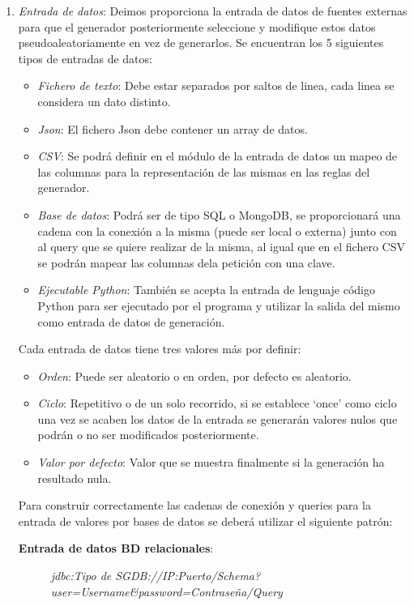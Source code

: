 \begin{enumerate}
	\item \emph{Entrada de datos}: Deimos proporciona la entrada de datos de fuentes externas para que el generador posteriormente seleccione y modifique estos datos pseudoaleatoriamente en vez de generarlos. Se encuentran los 5 siguientes tipos de entradas de datos:
	\begin{itemize}
		\item \emph{Fichero de texto}: Debe estar separados por saltos de linea, cada linea se considera un dato distinto.
		\item \emph{Json}: El fichero Json debe contener un array de datos.
		\item \emph{CSV}: Se podrá definir en el módulo de la entrada de datos un mapeo de las columnas para la representación de las mismas en las reglas del generador.
		\item \emph{Base de datos}: Podrá ser de tipo SQL o MongoDB, se proporcionará una cadena con la conexión a la misma (puede ser local o externa) junto con al query que se quiere realizar de la misma, al igual que en el fichero CSV se podrán mapear las columnas dela petición con una clave.
		\item \emph{Ejecutable Python}: También se acepta la entrada de lenguaje código Python para ser ejecutado por el programa y utilizar la salida del mismo como entrada de datos de generación.
	\end{itemize}
	
	Cada entrada de datos tiene tres valores más por definir:
	
	\begin{itemize}
		\item \emph{Orden}: Puede ser aleatorio o en orden, por defecto es aleatorio.
		\item \emph{Ciclo}: Repetitivo o de un solo recorrido, si se establece `once' como ciclo una vez se acaben los datos de la entrada se generarán valores nulos que podrán o no ser modificados posteriormente.
		\item \emph{Valor por defecto}: Valor que se muestra finalmente si la generación ha resultado nula.
	\end{itemize}

	Para construir correctamente las cadenas de conexión y queries para la entrada de valores por bases de datos se deberá utilizar el siguiente patrón:

	\textbf{Entrada de datos BD relacionales}:

	\begin{figure}[H]
		\centerline{\emph{jdbc:Tipo de SGDB://IP:Puerto/Schema?user=Username\&password=Contraseña/Query}}
	\end{figure}


\end{enumerate}
